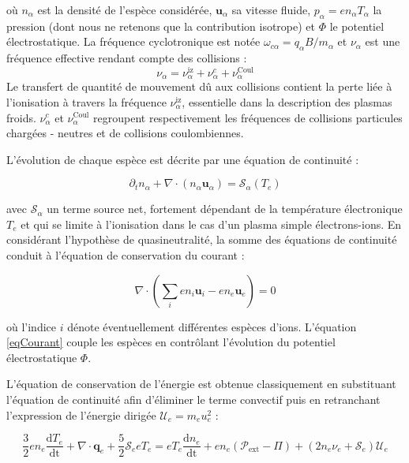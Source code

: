\begin{refsection}
où $n_\alpha$ est la densité de l'espèce considérée, $\mathbf{u}_\alpha$ sa
vitesse fluide, $p_\alpha =en_\alpha T_\alpha$ la pression (dont nous ne
retenons que la contribution isotrope) et $\Phi$ le potentiel électrostatique. La fréquence
cyclotronique est notée $\omega_{c\alpha}=q_\alpha B/m_\alpha$ et $\nu_\alpha$
est une fréquence effective rendant compte des collisions :
\begin{equation*}
\nu_\alpha=\nu_{\alpha}^\text{iz}+\nu_{\alpha}^{c}+\nu_{\alpha}^\text{Coul}
\end{equation*}
Le transfert de quantité de mouvement dû aux collisions contient la perte liée à
l'ionisation à travers la fréquence $\nu_{\alpha}^\text{iz}$, essentielle dans
la description des plasmas froids. $\nu_{\alpha}^{c}$ et
$\nu_{\alpha}^\text{Coul}$ regroupent respectivement les fréquences de
collisions particules chargées - neutres et de collisions coulombiennes.

L'évolution de chaque espèce est décrite par une équation de continuité :

\begin{equation}
\label{3-continuite}
\partial_t n_\alpha +
\nabla\cdot\left(n_\alpha\mathbf{u}_\alpha\right)=\mathcal{S}_\alpha(T_e)
\end{equation}

avec $\mathcal{S}_\alpha$ un terme source net, fortement dépendant de la
température électronique $T_e$ et qui se limite à l'ionisation dans le cas d'un
plasma simple électrons-ions.
En considérant l'hypothèse de quasineutralité, la somme des équations de
continuité conduit à l'équation de conservation du courant :

\begin{equation}
\label{eqCourant}
\nabla\cdot(\sum_ien_i\mathbf{u}_i-en_e\mathbf{u}_e)=0
\end{equation}

où l'indice $i$ dénote éventuellement différentes espèces d'ions. 
L'équation \eqref{eqCourant} couple les espèces en contrôlant
l'évolution du potentiel électrostatique $\Phi$.

L'équation de conservation de l'énergie est obtenue classiquement en substituant
l'équation de continuité afin d'éliminer le terme convectif puis en retranchant
l'expression de l'énergie dirigée $\mathcal{U}_e=m_eu_e^2$ :

\begin{equation}
\label{3-eqTemperature}
\frac{3}{2}en_e\frac{\text{d}T_e}{\text{dt}}+\nabla\cdot\mathbf
q_e + \frac{5}{2}\mathcal{S}_e eT_e = eT_e\frac{\text{d}n_e}{\text{dt}}+ 
{en_e\left(\mathcal{P}_\text{ext}-\Pi\right)}+(2n_e\nu_e+\mathcal{S}_e)\mathcal{U}_e
\end{equation}


\end{refsection}

